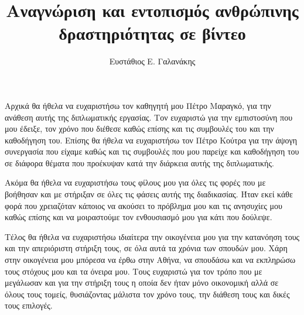\documentclass[10pt, twoside, a4paper]{cvsp-thesis}
\title{Αναγνώριση και εντοπισμός ανθρώπινης δραστηριότητας σε βίντεο}
\author{Ευστάθιος Ε. Γαλανάκης}
\newcommand{\gr}{\selectlanguage{greek}}
\begin{document}
\gr
\maketitle

\begin{acknowledgements}
  Αρχικά θα ήθελα να ευχαριστήσω τον καθηγητή μου Πέτρο Μαραγκό, για την ανάθεση αυτής της διπλωματικής εργασίας. Τον ευχαριστώ για την εμπιστοσύνη που μου έδειξε, τον
  χρόνο που διέθεσε καθώς επίσης και τις συμβουλές του και την καθοδήγηση του. Επίσης θα ήθελα να ευχαριστήσω τον Πέτρο Κούτρα για την άψογη συνεργασία που είχαμε καθώς και τις
  συμβουλές που μου παρείχε και καθοδήγηση του σε διάφορα θέματα που προέκυψαν κατά την διάρκεια αυτής της διπλωματικής.\par
  Ακόμα θα ήθελα να ευχαριστήσω τους φίλους μου για όλες τις φορές που με βοήθησαν και με στήριξαν σε όλες τις φάσεις αυτής της διαδικασίας. Ήταν εκεί κάθε φορά που χρειαζόταν κάποιος να
  ακούσει το πρόβλημα μου και τις ανησυχίες μου καθώς επίσης και να μοιραστούμε τον ενθουσιασμό μου για κάτι που δούλεψε.  \par
  Τέλος θα ήθελα να ευχαριστήσω ιδιαίτερα την οικογένεια μου για την κατανόηση τους και την απεριόριστη στήριξη τους, σε όλα αυτά τα χρόνια των σπουδών μου. Χάρη στην οικογένεια μου
  μπόρεσα να έρθω στην Αθήνα, να σπουδάσω και να εκπληρώσω τους στόχους μου και τα όνειρα μου. Τους ευχαριστώ για τον τρόπο που με μεγάλωσαν και για την στήριξη τους η οποία δεν ήταν
  μόνο οικονομική αλλά σε όλους τους τομείς,  θυσιάζοντας μάλιστα τον χρόνο τους, την διάθεση τους και δικές τους επιλογές.
\end{acknowledgements}
\end{document}
